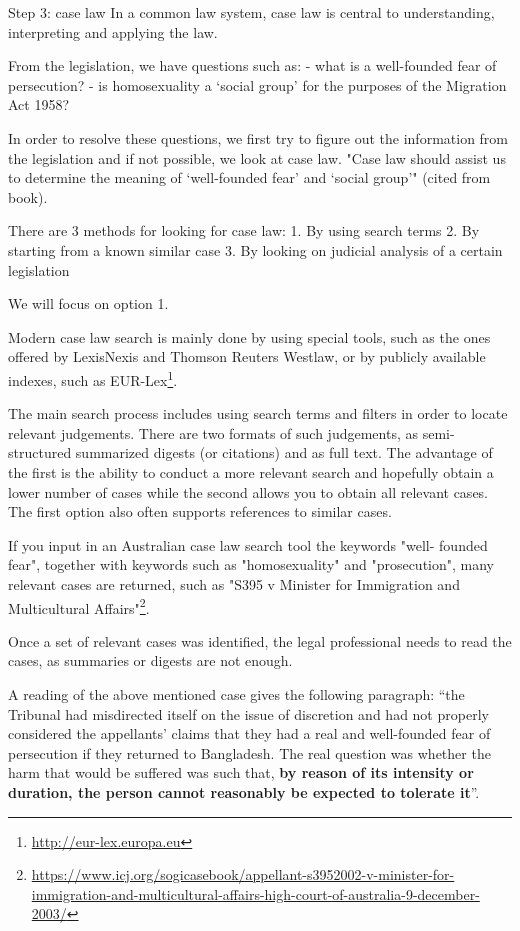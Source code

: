 Step 3: case law
In a common law system, case law is central to
understanding, interpreting and applying the law.

From the legislation, we have questions such as:
- what is a well-founded fear of persecution?
- is homosexuality a ‘social group’ for the purposes of the Migration Act 1958?

In order to resolve these questions, we first try to figure out the information from the legislation and if not possible, we look at case law. "Case law should assist us to determine the meaning of ‘well-founded fear’ and ‘social group’" (cited from book).

There are 3 methods for looking for case law:
1. By using search terms 
2. By starting from a known similar case
3. By looking on judicial analysis of a certain legislation

We will focus on option 1.

Modern case law search is mainly done by using special tools, such as the ones offered by LexisNexis and Thomson Reuters Westlaw, or by publicly available indexes, such as EUR-Lex\footnote{\url{http://eur-lex.europa.eu}}.

The main search process includes using search terms and filters in order to locate relevant judgements. There are two formats of such judgements, as semi-structured summarized digests (or citations) and as full text. The advantage of the first is the ability to conduct a more relevant search and hopefully obtain a lower number of cases while the second allows you to obtain all relevant cases. The first option also often supports references to similar cases.

If you input in an Australian case law search tool the keywords "well-
founded fear", together with keywords such as "homosexuality" and "prosecution", many relevant cases are returned, such as "S395 v Minister for Immigration and Multicultural Affairs"\footnote{\url{https://www.icj.org/sogicasebook/appellant-s3952002-v-minister-for-immigration-and-multicultural-affairs-high-court-of-australia-9-december-2003/}}. 

Once a set of relevant cases was identified, the legal professional needs to read the cases, as summaries or digests are not enough.

A reading of the above mentioned case gives the following paragraph: ``the Tribunal had misdirected itself on the issue of discretion and had not properly considered the appellants’ claims that they had a real and well-founded fear of persecution if they returned to Bangladesh. The real question was whether the harm that would be suffered was such that, {\bf by reason of its intensity or duration, the person cannot reasonably be expected to tolerate it}''.

